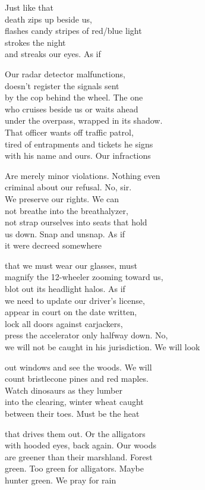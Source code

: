 \documentclass[twoside,10pt]{book}
\begin{document}
Just like that\\
death zips up beside us,\\
flashes candy stripes of red/blue light\\
strokes the night\\
and streaks our eyes. As if

Our radar detector malfunctions,\\
doesn't register the signals sent\\
by the cop behind the wheel. The one\\
who cruises beside us or waits ahead\\
under the overpass, wrapped in its shadow.\\
That officer wants off traffic patrol,\\
tired of entrapments and tickets he signs\\
with his name and ours. Our infractions

Are merely minor violations. Nothing even\\
criminal about our refusal. No, sir.\\
We preserve our rights. We can\\
not breathe into the breathalyzer,\\
not strap ourselves into seats that hold\\
us down. Snap and unsnap. As if\\
it were decreed somewhere

that we must wear our glasses, must\\
magnify the 12-wheeler zooming toward us,\\
blot out its headlight halos. As if\\
we need to update our driver's license,\\
appear in court on the date written,\\
lock all doors against carjackers,\\
press the accelerator only halfway down. No,\\
we will not be caught in his jurisdiction. We will look

out windows and see the woods. We will\\
count bristlecone pines and red maples.\\
Watch dinosaurs as they lumber\\
into the clearing, winter wheat caught\\
between their toes. Must be the heat

that drives them out. Or the alligators\\
with hooded eyes, back again. Our woods\\
are greener than their marshland. Forest\\
green. Too green for alligators. Maybe\\
hunter green. We pray for rain
\end{document}
